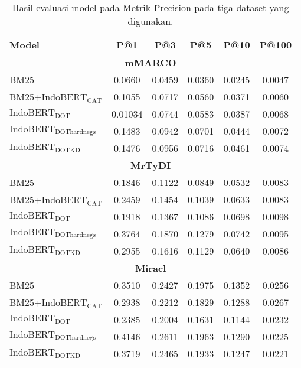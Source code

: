 \newpage

\begin{table}
    \centering
    \caption{Hasil evaluasi model pada Metrik \f{Precision} pada tiga \f{dataset} yang digunakan.}
    \label{tab:evalprecision}
    \begin{tabular}{lccccc}
        \hline
        Model & P@1 & P@3 & P@5 & P@10 & P@100 \\
        \hline
        \multicolumn{6}{c}{\textbf{mMARCO}} \\
        BM25 & 0.0660 & 0.0459 & 0.0360 & 0.0245 & 0.0047 \\
        BM25+$\text{IndoBERT}_{\text{CAT}}$  & 0.1055 & 0.0717 & 0.0560 & 0.0371 & 0.0060 \\
        $\text{IndoBERT}_{\text{DOT}}$ & 0.01034 & 0.0744 & 0.0583 & 0.0387 & 0.0068 \\
        $\text{IndoBERT}_{\text{DOThardnegs}} $ & 0.1483 & 0.0942 & 0.0701 & 0.0444 & 0.0072 \\
        $\text{IndoBERT}_{\text{DOTKD}}$ &  0.1476 & 0.0956 & 0.0716 & 0.0461 & 0.0074 \\
        \hline
        \multicolumn{6}{c}{\textbf{MrTyDI}} \\
        BM25 & 0.1846 & 0.1122 & 0.0849 & 0.0532 & 0.0083 \\
        BM25+$\text{IndoBERT}_{\text{CAT}}$  & 0.2459 & 0.1454 & 0.1039 & 0.0633 & 0.0083 \\
        $\text{IndoBERT}_{\text{DOT}}$ & 0.1918 & 0.1367 & 0.1086 & 0.0698 & 0.0098 \\
        $\text{IndoBERT}_{\text{DOThardnegs}} $ & 0.3764 & 0.1870 & 0.1279 & 0.0742 & 0.0095 \\
        $\text{IndoBERT}_{\text{DOTKD}}$ & 0.2955 & 0.1616 & 0.1129 & 0.0640 & 0.0086 \\
        \hline
        \multicolumn{6}{c}{\textbf{Miracl}} \\
        BM25 & 0.3510 & 0.2427 & 0.1975 & 0.1352 & 0.0256 \\
        BM25+$\text{IndoBERT}_{\text{CAT}}$  & 0.2938 & 0.2212 & 0.1829 & 0.1288 & 0.0267 \\
        $\text{IndoBERT}_{\text{DOT}}$ & 0.2385 & 0.2004 & 0.1631 & 0.1144 & 0.0232 \\
        $\text{IndoBERT}_{\text{DOThardnegs}} $ & 0.4146 & 0.2611 & 0.1963 & 0.1290 & 0.0225 \\
        $\text{IndoBERT}_{\text{DOTKD}}$ & 0.3719 & 0.2465 & 0.1933 & 0.1247 & 0.0221 \\
        \hline
        
        \end{tabular}
        
\end{table}


